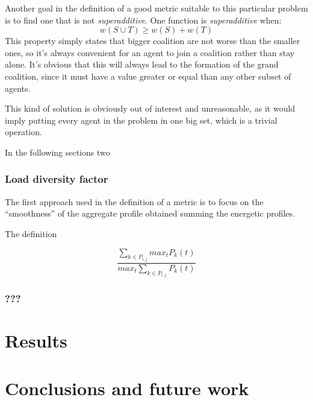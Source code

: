 \documentclass[12pt,a4paper]{report}
\begin{document}
Another goal in the definition of a good metric suitable to this particular problem is to find one that is not \textit{superadditive}. One function is \textit{superadditive} when:
$$w ( S \cup T ) \geq w (S) + w (T)$$
This property simply states that bigger coalition are not worse than the smaller ones, so it's always convenient for an agent to join a coalition rather than stay alone. It's obvious that this will always lead to the formation of the grand coalition, since it must have a value greater or equal than any other subset of agents.

This kind of solution is obviously out of interest and unreasonable, as it would imply putting every agent in the problem in one big set, which is a trivial operation.



In the following sections two 

\subsection{Load diversity factor}

The first approach used in the definition of a metric is to focus on the ``smoothness'' of the aggregate profile obtained summing the energetic profiles. 

The definition 

$$
\frac{\sum_{k \in P_{i,j}} {max}_t P_k\left(t\right)}{{max}_t \sum_{k \in P_{i,j}} P_k\left(t\right)}
$$

\subsection{???}


\chapter{Results}
\label{chap:results}


\chapter{Conclusions and future work}
\label{chap:concl}

\end{document}
